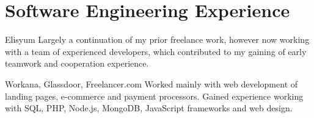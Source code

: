 \section{Software Engineering Experience}

\begin{experience}{Elisyum}{
}
Largely a continuation of my prior freelance work, however now working with a team of experienced developers, which contributed to my gaining of early teamwork and cooperation experience.

\end{experience}
\begin{experience}[last]{Workana, Glassdoor, Freelancer.com}{
}
Worked mainly with web development of landing pages, e-commerce and payment processors. Gained experience working with SQL, PHP, Node.js, MongoDB, JavaScript frameworks
 and web design.

\end{experience}
